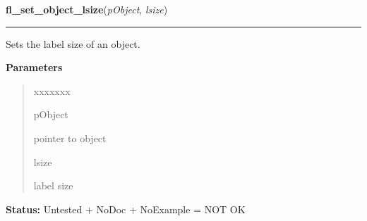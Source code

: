 \hspace{.8\funcindent}\begin{boxedminipage}{\funcwidth}

    \raggedright \textbf{fl\_set\_object\_lsize}(\textit{pObject}, \textit{lsize})

    \vspace{-1.5ex}

    \rule{\textwidth}{0.5\fboxrule}
\setlength{\parskip}{2ex}
    Sets the label size of an object.

\setlength{\parskip}{1ex}
      \textbf{Parameters}
      \vspace{-1ex}

      \begin{quote}
        \begin{Ventry}{xxxxxxx}

          \item[pObject]

          pointer to object

          \item[lsize]

          label size

        \end{Ventry}

      \end{quote}

\textbf{Status:} Untested + NoDoc + NoExample = NOT OK



    \end{boxedminipage}

    \label{xformslib:library:fl_get_object_lsize}

    \vspace{0.5ex}

